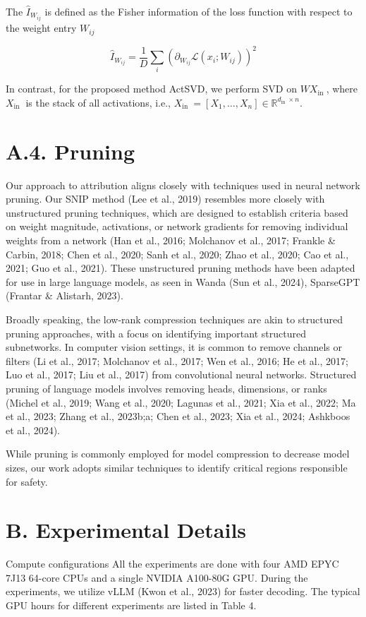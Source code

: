 \documentclass[10pt]{article}
\begin{document}
The $\hat{I}_{W_{i j}}$ is defined as the Fisher information of the loss function with respect to the weight entry $W_{i j}$

$$
\hat{I}_{W_{i j}}=\frac{1}{D} \sum_{i}\left(\partial_{W_{i j}} \mathcal{L}\left(x_{i} ; W_{i j}\right)\right)^{2}
$$

In contrast, for the proposed method ActSVD, we perform SVD on $W X_{\text {in }}$, where $X_{\text {in }}$ is the stack of all activations, i.e., $X_{\text {in }}=\left[X_{1}, \ldots, X_{n}\right] \in \mathbb{R}^{d_{\text {in }} \times n}$.

\section*{A.4. Pruning}
Our approach to attribution aligns closely with techniques used in neural network pruning. Our SNIP method (Lee et al., 2019) resembles more closely with unstructured pruning techniques, which are designed to establish criteria based on weight magnitude, activations, or network gradients for removing individual weights from a network (Han et al., 2016; Molchanov et al., 2017; Frankle \& Carbin, 2018; Chen et al., 2020; Sanh et al., 2020; Zhao et al., 2020; Cao et al., 2021; Guo et al., 2021). These unstructured pruning methods have been adapted for use in large language models, as seen in Wanda (Sun et al., 2024), SparseGPT (Frantar \& Alistarh, 2023).

Broadly speaking, the low-rank compression techniques are akin to structured pruning approaches, with a focus on identifying important structured subnetworks. In computer vision settings, it is common to remove channels or filters (Li et al., 2017; Molchanov et al., 2017; Wen et al., 2016; He et al., 2017; Luo et al., 2017; Liu et al., 2017) from convolutional neural networks. Structured pruning of language models involves removing heads, dimensions, or ranks (Michel et al., 2019; Wang et al., 2020; Lagunas et al., 2021; Xia et al., 2022; Ma et al., 2023; Zhang et al., 2023b;a; Chen et al., 2023; Xia et al., 2024; Ashkboos et al., 2024).

While pruning is commonly employed for model compression to decrease model sizes, our work adopts similar techniques to identify critical regions responsible for safety.

\section*{B. Experimental Details}
Compute configurations All the experiments are done with four AMD EPYC 7J13 64-core CPUs and a single NVIDIA A100-80G GPU. During the experiments, we utilize vLLM (Kwon et al., 2023) for faster decoding. The typical GPU hours for different experiments are listed in Table 4.
\end{document}
